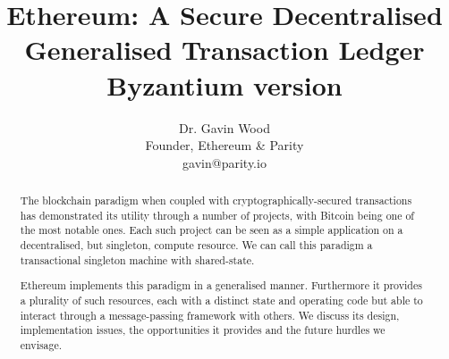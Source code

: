 \documentclass[9pt,oneside]{amsart}
\title{Ethereum: A Secure Decentralised Generalised Transaction Ledger \\ {\smaller \textbf{Byzantium version \YellowPaperVersionNumber{}}}}
\author{
    Dr. Gavin Wood\\
    Founder, Ethereum \& Parity\\
    gavin@parity.io
}
\begin{document}
\pagecolor{lightyellow}

\begin{abstract}
The blockchain paradigm when coupled with cryptographically-secured transactions has demonstrated its utility through a number of projects, with Bitcoin being one of the most notable ones. Each such project can be seen as a simple application on a decentralised, but singleton, compute resource. We can call this paradigm a transactional singleton machine with shared-state.

Ethereum implements this paradigm in a generalised manner. Furthermore it provides a plurality of such resources, each with a distinct state and operating code but able to interact through a message-passing framework with others. We discuss its design, implementation issues, the opportunities it provides and the future hurdles we envisage.
\end{abstract}

\maketitle
\end{document}
